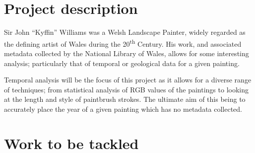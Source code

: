 \documentclass[11pt,fleqn,twoside]{article}
\begin{document}

\mmp

\setcounter{tocdepth}{3} %


\section{Project description}
Sir John ``Kyffin'' Williams was a Welsh Landscape Painter, widely regarded as the defining artist of Wales during the 20\textsuperscript{th} Century\cite[p.957-958]{davies08}. His work, and associated metadata collected by the National Library of Wales, allows for some interesting analysis; particularly that of temporal or geological %
data for a given painting.

Temporal analysis will be the focus of this project as it allows for a diverse range of techniques; from statistical analysis of RGB values of the paintings to looking at the length and style of paintbrush strokes. The ultimate aim of this being to accurately place the year of a given painting which has no metadata collected.

\section{Work to be tackled}
\end{document}
